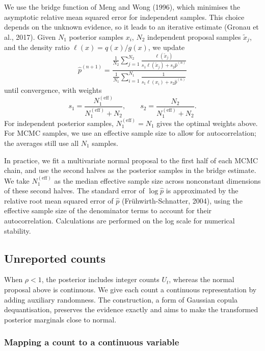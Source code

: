 \documentclass{article}
\begin{document}
We use the bridge function of Meng and Wong (1996), which minimises the
asymptotic relative mean squared error for independent samples. This choice
depends on the unknown evidence, so it leads to an iterative estimate
(Gronau et al., 2017). Given \(N_1\) posterior samples \(x_i\), \(N_2\)
independent proposal samples \(\tilde x_j\), and the density ratio
\(\ell(x)=q(x)/g(x)\), we update
\begin{equation}
  \hat p^{(n+1)}=\frac{\displaystyle\frac{1}{N_2}\sum_{j=1}^{N_2}
  \frac{\ell(\tilde x_j)}{s_1\ell(\tilde x_j)+s_2\hat p^{(n)}}}
  {\displaystyle\frac{1}{N_1}\sum_{i=1}^{N_1}
  \frac{1}{s_1\ell(x_i)+s_2\hat p^{(n)}}}
\end{equation}
until convergence, with weights
\begin{equation}
  s_1=\frac{N_1^{(\mathrm{eff})}}{N_1^{(\mathrm{eff})}+N_2},\qquad
  s_2=\frac{N_2}{N_1^{(\mathrm{eff})}+N_2}.
\end{equation}
For independent posterior samples, \(N_1^{(\mathrm{eff})}=N_1\) gives the
optimal weights above. For MCMC samples, we use an effective sample size
to allow for autocorrelation; the averages still use all \(N_1\) samples.

In practice, we fit a multivariate normal proposal to the first half of
each MCMC chain, and use the second halves as the posterior samples in the
bridge estimate. We take \(N_1^{(\mathrm{eff})}\) as the median effective
sample size across nonconstant dimensions of these second halves. The
standard error of \(\log\hat p\) is approximated by the relative root mean
squared error of \(\hat p\) (Fr\"uhwirth-Schnatter, 2004), using the
effective sample size of the denominator terms to account for their
autocorrelation. Calculations are performed on the log scale for numerical
stability.

\subsection{Unreported counts}

When \(\rho<1\), the posterior includes integer counts \(U_t\), whereas
the normal proposal above is continuous. We give each count a continuous
representation by adding auxiliary randomness. The construction, a form of
Gaussian copula dequantisation, preserves the evidence exactly and aims to
make the transformed posterior marginals close to normal.

\subsubsection{Mapping a count to a continuous variable}
\end{document}
